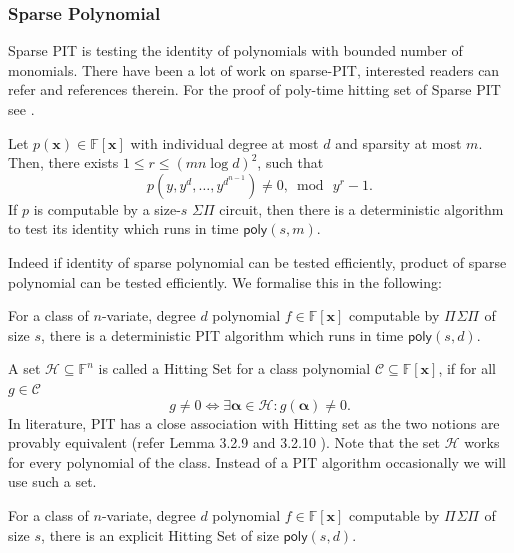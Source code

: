 \documentclass[10pt,a4paper]{article}
\newcommand{\poly}{\mathsf{poly}}
\newcommand{\F}{\mathbb{F}}
\newcommand{\x}{{\boldsymbol x}}
\newcommand{\alphavec}{\boldsymbol \alpha}
\newcommand{\calC}{\mathcal{C}}
\newcommand{\calH}{\mathcal{H}}
\newcommand{\PSP}[2]{\Pi^{#1}\Sigma\Pi^{#2}}
\newcommand{\PSU}[2]{\Pi^{#1} \Sigma\wedge^{#2}}
\numberwithin{equation}{section}
\begin{document}
\subsubsection*{Sparse Polynomial}
Sparse PIT is testing the identity of polynomials with bounded number of monomials. There have been a lot of work on sparse-PIT, interested readers can refer \cite{ben1988deterministic,klivans2001randomness} and references therein. For the proof of poly-time hitting set of Sparse PIT see \cite[Thm.~2.1]{saxena2009progress}.

\begin{theorem} \label{thm:sparse-ks}
Let $p(\x) \in \F[\x]$ with individual degree at most $d$ and sparsity at most $m$. Then, there exists $1 \le r \le (mn \log d)^2$, such that \[ p(y,y^d,\hdots,y^{d^{n-1}}) \ne 0,\bmod\,y^r-1.\] If $p$ is computable by a size-$s$ $\Sigma \Pi$ circuit, then there is a deterministic algorithm to test its identity which runs in time $\poly(s,m)$.
\end{theorem}

Indeed if identity of sparse polynomial can be tested efficiently, product of sparse polynomial can be tested efficiently. We formalise this in the following:

\begin{lemma} \label{lem:prod-sparse-PIT}
    For a class of $n$-variate, degree $d$ polynomial $f \in \F[\x]$ computable by $\PSP{}{}$ of size $s$, there is a deterministic PIT algorithm which runs in time $\poly(s,d)$.
\end{lemma}

A set $\calH \subseteq \F^n$ is called a Hitting Set for a class polynomial $\calC \subseteq \F[\x]$, if for all $g \in \calC$ \[ g \neq 0 \iff \exists \alphavec \in \calH : g(\alphavec) \neq 0.\]
In literature, PIT has a close association with Hitting set as the two notions are provably equivalent (refer Lemma 3.2.9 and 3.2.10 \cite{Forbes14Thesis}). Note that the set $\calH$ works for every polynomial of the class. Instead of a PIT algorithm occasionally we will use such a set.

\begin{lemma}[Hitting Set of $\PSU{}{}$] \label{lem:prod-sparse-hs}
    For a class of $n$-variate, degree $d$ polynomial $f \in \F[\x]$ computable by $\PSP{}{}$ of size $s$, there is an explicit Hitting Set of size $\poly(s,d)$.
\end{lemma}
\end{document}
